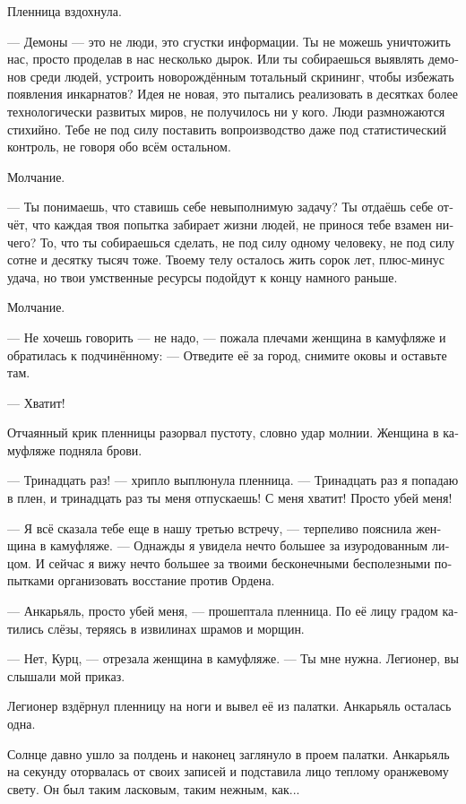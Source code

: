 \documentclass[a4paper,10pt,fleqn]{book}\usepackage{polyglossia}\setdefaultlanguage[babelshorthands=true]{russian}\setotherlanguage{english}\defaultfontfeatures{Ligatures=TeX,Mapping=tex-text}\usepackage{xcolor}\newcommand{\ml}[3]{#2}
\begin{document}
Пленница вздохнула.

--- Демоны --- это не люди, это сгустки информации.
Ты не можешь уничтожить нас, просто проделав в нас несколько дырок.
Или ты собираешься выявлять демонов среди людей, устроить новорождённым тотальный скрининг, чтобы избежать появления инкарнатов?
Идея не новая, это пытались реализовать в десятках более технологически развитых миров, не получилось ни у кого.
Люди размножаются стихийно.
Тебе не под силу поставить вопроизводство даже под статистический контроль, не говоря обо всём остальном.

Молчание.

--- Ты понимаешь, что ставишь себе невыполнимую задачу?
Ты отдаёшь себе отчёт, что каждая твоя попытка забирает жизни людей, не принося тебе взамен ничего?
То, что ты собираешься сделать, не под силу одному человеку, не под силу сотне и десятку тысяч тоже.
Твоему телу осталось жить сорок лет, плюс-минус удача, но твои умственные ресурсы подойдут к концу намного раньше.

Молчание.

--- Не хочешь говорить --- не надо, --- пожала плечами женщина в камуфляже и обратилась к подчинённому:
--- Отведите её за город, снимите оковы и оставьте там.

--- Хватит!

Отчаянный крик пленницы разорвал пустоту, словно удар молнии.
Женщина в камуфляже подняла брови.

--- Тринадцать раз! --- хрипло выплюнула пленница.
--- Тринадцать раз я попадаю в плен, и тринадцать раз ты меня отпускаешь!
С меня хватит!
Просто убей меня!

--- Я всё сказала тебе еще в нашу третью встречу, --- терпеливо пояснила женщина в камуфляже.
--- Однажды я увидела нечто большее за изуродованным лицом.
И сейчас я вижу нечто большее за твоими бесконечными бесполезными попытками организовать восстание против Ордена.

--- Анкарьяль, просто убей меня, --- прошептала пленница.
По её лицу градом катились слёзы, теряясь в извилинах шрамов и морщин.

--- Нет, Курц, --- отрезала женщина в камуфляже.
--- Ты мне нужна.
Легионер, вы слышали мой приказ.

Легионер вздёрнул пленницу на ноги и вывел её из палатки.
Анкарьяль осталась одна.

Солнце давно ушло за полдень и наконец заглянуло в проем палатки.
Анкарьяль на секунду оторвалась от своих записей и подставила лицо теплому оранжевому свету.
Он был таким ласковым, таким нежным, как...
\end{document}

